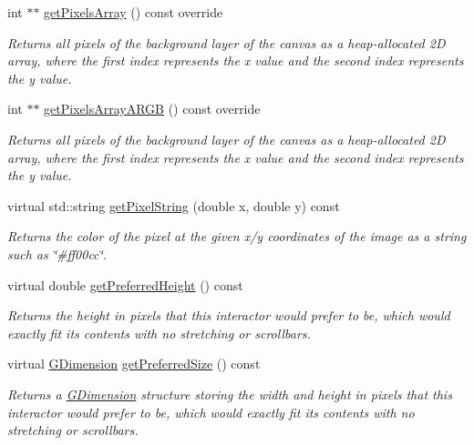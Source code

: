\begin{DoxyCompactItemize}
int $\ast$$\ast$ \mbox{\hyperlink{classsgl_1_1GCanvas_a92e494e15293328503821bbe388d7933}{get\+Pixels\+Array}} () const override
\begin{DoxyCompactList}\small\item\em Returns all pixels of the background layer of the canvas as a heap-\/allocated 2D array, where the first index represents the x value and the second index represents the y value. \end{DoxyCompactList}\item 
int $\ast$$\ast$ \mbox{\hyperlink{classsgl_1_1GCanvas_a32164dac42ec2253f2c92a27ad98af74}{get\+Pixels\+Array\+A\+R\+GB}} () const override
\begin{DoxyCompactList}\small\item\em Returns all pixels of the background layer of the canvas as a heap-\/allocated 2D array, where the first index represents the x value and the second index represents the y value. \end{DoxyCompactList}\item 
virtual std\+::string \mbox{\hyperlink{classsgl_1_1GDrawingSurface_a8da04ef488ec5fa498fbbffaf50928fd}{get\+Pixel\+String}} (double x, double y) const
\begin{DoxyCompactList}\small\item\em Returns the color of the pixel at the given x/y coordinates of the image as a string such as \char`\"{}\#ff00cc\char`\"{}. \end{DoxyCompactList}\item 
virtual double \mbox{\hyperlink{classsgl_1_1GInteractor_a747de0961653847bdc6615dbf756d715}{get\+Preferred\+Height}} () const
\begin{DoxyCompactList}\small\item\em Returns the height in pixels that this interactor would prefer to be, which would exactly fit its contents with no stretching or scrollbars. \end{DoxyCompactList}\item 
virtual \mbox{\hyperlink{structsgl_1_1GDimension}{G\+Dimension}} \mbox{\hyperlink{classsgl_1_1GInteractor_a4aabbee761d8e9116275401131b7ccd1}{get\+Preferred\+Size}} () const
\begin{DoxyCompactList}\small\item\em Returns a \mbox{\hyperlink{structsgl_1_1GDimension}{G\+Dimension}} structure storing the width and height in pixels that this interactor would prefer to be, which would exactly fit its contents with no stretching or scrollbars. \end{DoxyCompactList}\item 

\end{DoxyCompactItemize}
